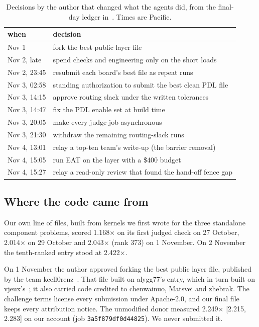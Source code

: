 \documentclass[11pt]{article}
\begin{document}
\begin{table}[t]
\centering
\caption{Decisions by the author that changed what the agents did, from the
final-day ledger in~\cite{repo}. Times are Pacific.}
\label{tab:decisions}
\small
\begin{tabular}{ll}
\toprule
when & decision\\
\midrule
Nov 1 & fork the best public layer file\\
Nov 2, late & spend checks and engineering only on the short loads\\
Nov 2, 23:45 & resubmit each board's best file as repeat runs\\
Nov 3, 02:58 & standing authorization to submit the best clean PDL file\\
Nov 3, 14:15 & approve routing slack under the written tolerances\\
Nov 3, 14:47 & fix the PDL enable set at build time\\
Nov 3, 20:05 & make every judge job asynchronous\\
Nov 3, 21:30 & withdraw the remaining routing-slack runs\\
Nov 4, 13:01 & relay a top-ten team's write-up (the barrier removal)\\
Nov 4, 15:05 & run EAT on the layer with a \$400 budget\\
Nov 4, 15:27 & relay a read-only review that found the hand-off fence gap\\
\bottomrule
\end{tabular}
\end{table}

\subsection{Where the code came from}

Our own line of files, built from kernels we first wrote for the three
standalone component problems, scored 1.168$\times$ on its first judged check on
27 October, 2.014$\times$ on 29 October and 2.043$\times$ (rank 373) on
1 November. On 2 November the tenth-ranked entry stood at 2.422$\times$.

On 1 November the author approved forking the best public layer file, published
by the team keell0renz~\cite{keell}. That file built on alygg77's entry, which in
turn built on vjeux's~\cite{vjeux}; it also carried code credited to chenwainuo,
Matsvei and zhebrak. The challenge terms license every submission under
Apache-2.0, and our final file keeps every attribution notice. The unmodified
donor measured 2.249$\times$ [2.215, 2.283] on our account (job
\texttt{3a5f879df0d44825}). We never submitted it.
\end{document}
